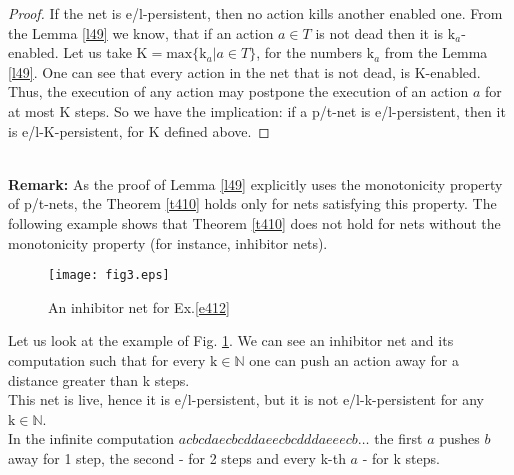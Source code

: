 \documentclass[a4paper]{llncs}
\begin{document}
\begin{proof}
If the net is e/l-persistent, then no action kills another enabled one. From the Lemma \ref{l49} we know, that if an action $a \in T$ is not dead then it is $\mathrm{k}_a$-enabled.
Let us take $\mathrm{K}=\mathrm{max}\{\mathrm{k}_a | a\in T\}$, for the numbers $\mathrm{k}_a$ from the Lemma \ref{l49}. One can see that every action in the net that is not dead, is K-enabled. Thus, the execution of any action may postpone the execution of an action $a$ for at most K steps. 	
So we have the implication: if a p/t-net is e/l-persistent, then it is e/l-K-persistent, for K defined above. 	
\end{proof}
\mbox{ }\\
\textbf{Remark:} As the proof of Lemma \ref{l49} explicitly uses the monotonicity property of p/t-nets, the Theorem \ref{t410} holds only for nets satisfying this property. The following example shows that Theorem \ref{t410} does not hold for nets without the monotonicity property (for instance, inhibitor nets).

\begin{example}
\label{e412}

\begin{figure}[h]
\centering
\texttt{[image: fig3.eps]}
\caption{An inhibitor net for Ex.\ref{e412}}
\label{Fig3}
\end{figure}

Let us look at the example of Fig. \ref{Fig3}. We can see an inhibitor net and its computation such that for every $\mathrm{k}\in\mathbb{N}$ one can push an action away for a distance greater than k steps.\\
This net is live, hence it is e/l-persistent, but it is not e/l-k-persistent for any $\mathrm{k}\in\mathbb{N}$.\\
In the infinite computation $acbcdaecbcddaeecbcdddaeeecb\ldots$ the first $a$ pushes $b$ away for 1 step, the second - for 2 steps and every k-th $a$ - for k steps.
\end{example}
\end{document}
